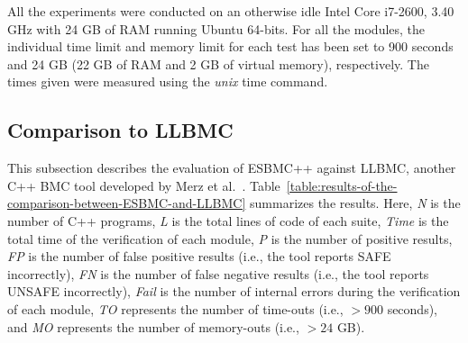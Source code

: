 \documentclass[a4paper]{llncs}
\begin{document}
All the experiments were conducted on an otherwise idle Intel Core i7-2600,
3.40 GHz with 24 GB of RAM running Ubuntu 64-bits. For all the modules,
the individual time limit and memory limit for each test has been set to 900 seconds
and 24 GB (22 GB of RAM and 2 GB of virtual memory), respectively.
The times given were measured using the \textit{unix} time command.

\subsection{Comparison to LLBMC}
\label{comparison-to-LLBMC}

This subsection describes the evaluation of ESBMC++
against LLBMC, another C++ BMC tool developed by Merz et al.~\cite{Florian12}.
Table~\ref{table:results-of-the-comparison-between-ESBMC-and-LLBMC}
summarizes the results. Here, \textit{N} is the number of C++ programs,
\textit{L} is the total lines of code of each suite, \textit{Time} is the
total time of the verification of each module, \textit{P} is the
number of positive results, \textit{FP} is the number of false positive
results (i.e., the tool reports SAFE incorrectly), \textit{FN} is the number
of false negative results (i.e., the tool reports UNSAFE incorrectly), \textit{Fail}
is the number of internal errors during the verification of each module,
\textit{TO} represents the number of time-outs (i.e., $>900$ seconds),
and \textit{MO} represents the number of memory-outs (i.e., $>24$ GB).
\end{document}

